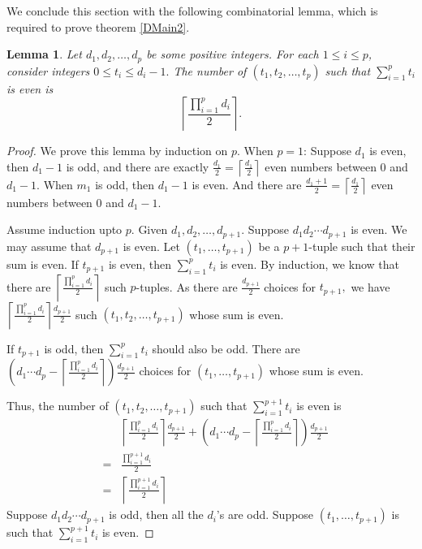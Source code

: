 \documentclass[12pt,twoside,reqno]{amsart}
\newtheorem{lemma}[theorem]{Lemma}
\theoremstyle{definition}
\numberwithin{equation}{section}
\begin{document}
We conclude this section with the following combinatorial lemma, which is required to prove theorem \ref{DMain2}.
\begin{lemma}\label{LemmaCount}
    Let $d_1,d_2,\ldots, d_p$ be some positive integers. For each $1 \leq i \leq p$, consider integers $0 \leq t_i \leq d_i - 1.$ The number of $(t_1, t_2, \ldots, t_p)$ such that $\sum_{i=1}^p t_i $ is even is $$\left\lceil\frac{\prod_{i=1}^p d_i}{2}\right\rceil.$$
    
\end{lemma}
\begin{proof}
    We prove this lemma by induction on $p$. When $p = 1$: Suppose $d_1$ is even, then $d_1 - 1$ is odd, and there are exactly $\displaystyle\frac{d_1}{2} = \left\lceil\frac{d_1}{2}\right\rceil$ even numbers between $0$ and $d_1 - 1$. When $m_1 $ is odd, then $d_1 -1$ is even. And there are $\displaystyle\frac{d_1 + 1}{2} = \left\lceil\frac{d_1}{2}\right\rceil$ even numbers between $0$ and $d_1 - 1$.

    Assume induction upto $p$. Given $d_1, d_2, \ldots, d_{p+1}$. Suppose $d_1d_2\cdots d_{p+1}$ is even. We may assume that $d_{p+1}$ is even. Let $(t_1,\ldots,t_{p+1})$ be a $p+1$-tuple such that their sum is even. If $t_{p+1}$ is even, then $\sum_{i=1}^p t_i$ is even. By induction, we know that there are $\left\lceil\frac{\prod_{i=1}^p d_i}{2}\right\rceil$ such $p$-tuples. As there are $\displaystyle\frac{d_{p+1}}{2}$ choices for $t_{p+1},$ we have $\displaystyle\left\lceil\frac{\prod_{i=1}^p d_i}{2}\right\rceil\frac{d_{p+1}}{2}$ such $(t_1,t_2,\ldots,t_{p+1})$ whose sum is even. 

    If $t_{p+1}$ is odd, then $\sum_{i=1}^p t_i$ should also be odd. There are $\displaystyle\left(d_1\cdots d_p - \left\lceil\frac{\prod_{i=1}^p d_i}{2}\right\rceil\right)\frac{d_{p+1}}{2} $ choices for $(t_1,\ldots,t_{p+1})$ whose sum is even. 

    Thus, the number of $(t_1,t_2,\ldots,t_{p+1})$ such that $\sum_{i=1}^{p+1}t_i$ is even is \begin{eqnarray*}
      &~&  \left\lceil\frac{\prod_{i=1}^p d_i}{2}\right\rceil\frac{d_{p+1}}{2} + \left(d_1\cdots d_p - \left\lceil\frac{\prod_{i=1}^p d_i}{2}\right\rceil\right)\frac{d_{p+1}}{2}\\
      &=& \frac{\prod_{i=1}^{p+1} d_i}{2}\\
      &=& \left\lceil\frac{\prod_{i=1}^{p+1} d_i}{2}\right\rceil
    \end{eqnarray*} 
    Suppose $d_1d_2\cdots d_{p+1}$ is odd, then all the $d_i$'s are odd. Suppose $(t_1,\ldots, t_{p+1})$ is such that $\sum_{i=1}^{p+1}t_i$ is even.


\end{proof}
\end{document}
